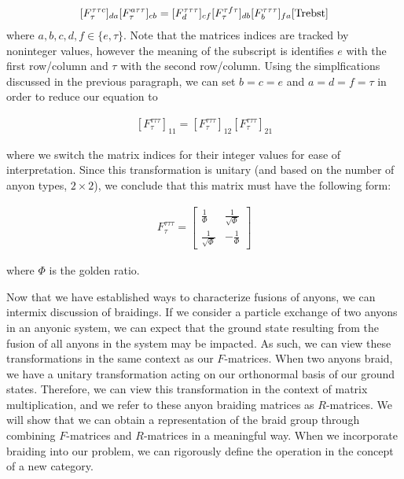 \documentclass[10pt]{ucthesis}
\begin{document}
\begin{equation}
	\begin{aligned}
		[F^{\tau\tau c}_\tau]_{da}[F^{a\tau\tau}_\tau]_{cb} = [F^{\tau\tau \tau}_d]_{cf}[F^{\tau f\tau}_\tau]_{db}[F^{\tau\tau\tau}_b]_{fa}\cite{Trebst}
	\end{aligned}
\end{equation}
where $a,b,c,d,f\in\{e,\tau\}$. Note that the matrices indices are tracked by noninteger values, however the meaning of the subscript is identifies $e$ with the first row/column and $\tau$ with the second row/column. Using the simplfications discussed in the previous paragraph, we can set $b=c=e$ and $a=d=f=\tau$ in order to reduce our equation to 

\begin{equation}
	\begin{aligned}
		[F^{\tau\tau\tau}_\tau]_{11} = [F^{\tau\tau\tau}_\tau]_{12}[F^{\tau\tau\tau}_\tau]_{21}
	\end{aligned}
\end{equation}

where we switch the matrix indices for their integer values for ease of interpretation. Since this transformation is unitary (and based on the number of anyon types, $2\times 2$), we conclude that this matrix must have the following form:

\begin{equation}
	\begin{aligned}
		F^{\tau\tau\tau}_\tau = \begin{bmatrix}
									\frac{1}{\Phi} & \frac{1}{\sqrt{\Phi}}\\
									\frac{1}{\sqrt{\Phi}} & -\frac{1}{\Phi}
								\end{bmatrix}
	\end{aligned}
\end{equation}

where $\Phi$ is the golden ratio.

Now that we have established ways to characterize fusions of anyons, we can intermix discussion of braidings. If we consider a particle exchange of two anyons in an anyonic system, we can expect that the ground state resulting from the fusion of all anyons in the system may be impacted. As such, we can view these transformations in the same context as our $F$-matrices. When two anyons braid, we have a unitary transformation acting on our orthonormal basis of our ground states. Therefore, we can view this transformation in the context of matrix multiplication, and we refer to these anyon braiding matrices as $R$-matrices. We will show that we can obtain a representation of the braid group through combining $F$-matrices and $R$-matrices in a meaningful way. When we incorporate braiding into our problem, we can rigorously define the operation in the concept of a new category.
\end{document}
